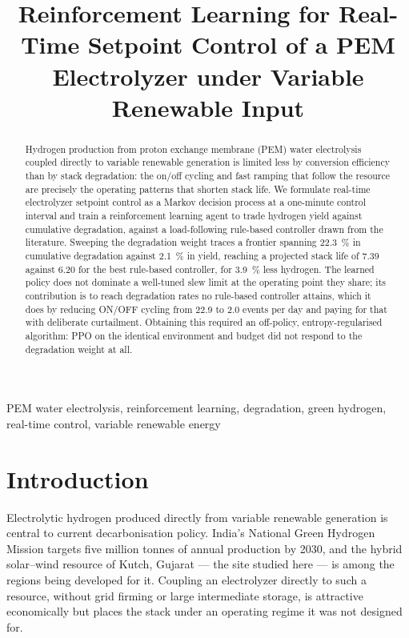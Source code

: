 \documentclass[conference]{IEEEtran}
\newcommand{\TODO}[1]{\textcolor{red}{[\textbf{TODO:} #1]}}
\begin{document}
\title{Reinforcement Learning for Real-Time Setpoint Control of a PEM
Electrolyzer under Variable Renewable Input}

\author{\IEEEauthorblockN{\TODO{authors}}
\IEEEauthorblockA{\TODO{affiliation}}}

\maketitle

\begin{abstract}
Hydrogen production from proton exchange membrane (PEM) water electrolysis coupled
directly to variable renewable generation is limited less by conversion efficiency than by
stack degradation: the on/off cycling and fast ramping that follow the resource are
precisely the operating patterns that shorten stack life. We formulate real-time
electrolyzer setpoint control as a Markov decision process at a one-minute control
interval and train a reinforcement learning agent to trade hydrogen yield against
cumulative degradation, against a load-following rule-based controller drawn from the
literature. Sweeping the degradation weight traces a frontier spanning \SI{22.3}{\percent}
in cumulative degradation against \SI{2.1}{\percent} in yield, reaching a projected
stack life of \SI{7.39}{\year} against \SI{6.20}{\year} for the best rule-based
controller, for \SI{3.9}{\percent} less hydrogen. The learned policy does not dominate
a well-tuned slew limit at the operating point they share; its contribution is to reach
degradation rates no rule-based controller attains, which it does by reducing ON/OFF
cycling from \num{22.9} to \num{2.0} events per day and paying for that with deliberate
curtailment. Obtaining this required an off-policy, entropy-regularised algorithm: PPO
on the identical environment and budget did not respond to the degradation weight at all.
\end{abstract}

\begin{IEEEkeywords}
PEM water electrolysis, reinforcement learning, degradation, green hydrogen,
real-time control, variable renewable energy
\end{IEEEkeywords}

\section{Introduction}
Electrolytic hydrogen produced directly from variable renewable generation is central to
current decarbonisation policy. India's National Green Hydrogen Mission targets
five million tonnes of annual production by 2030, and the hybrid solar--wind resource of
Kutch, Gujarat --- the site studied here --- is among the regions being developed for it.
Coupling an electrolyzer directly to such a resource, without grid firming or large
intermediate storage, is attractive economically but places the stack under an operating
regime it was not designed for.
\end{document}
